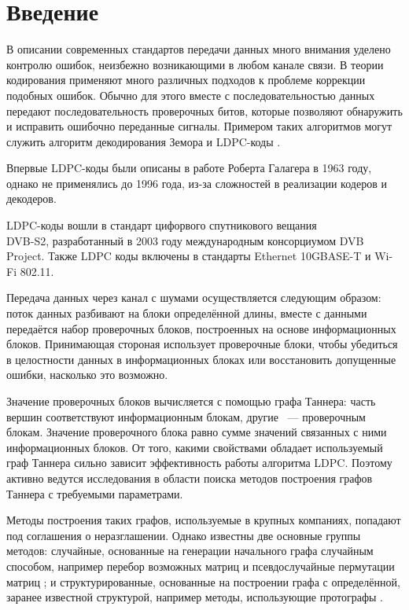 \documentclass[14pt]{mmcs-article}
\begin{document}


\renewcommand{\contentsname}{Оглавление}

\tableofcontents

\newpage
{}
\section*{Введение}

В описании современных стандартов передачи данных много внимания уделено контролю ошибок, неизбежно возникающими в любом канале связи. В теории кодирования применяют много различных подходов к проблеме коррекции подобных ошибок. Обычно для этого вместе с последовательностью данных передают последовательность проверочных битов, которые позволяют обнаружить и исправить ошибочно переданные сигналы. Примером таких алгоритмов могут служить алгоритм декодирования Земора \cite{zemor} и LDPC-коды \cite{johnson}.

Впервые LDPC-коды были описаны в работе Роберта Галагера \cite{gallager} в 1963 году, однако не применялись до 1996 года, из-за сложностей в реализации кодеров и декодеров.

LDPC-коды вошли в стандарт цифорвого спутникового вещания\\ DVB-S2, разработанный в 2003 году международным консорциумом DVB Project. Также LDPC коды включены в стандарты Ethernet 10GBASE-T и Wi-Fi 802.11.

Передача данных через канал с шумами осуществляется следующим образом: поток данных разбивают на блоки определённой длины, вместе с данными передаётся набор проверочных блоков, построенных на основе информационных блоков. Принимающая стороная использует проверочные блоки, чтобы убедиться в целостности данных в информационных блоках или  восстановить допущенные ошибки, насколько это возможно.

Значение проверочных блоков вычисляется с помощью графа Таннера: часть вершин соответствуют информационным блокам, другие ~--- проверочным блокам. Значение проверочного блока равно сумме значений связанных с ними информационных блоков. От того, какими свойствами обладает используемый граф Таннера сильно зависит эффективность работы алгоритма LDPC. Поэтому активно ведутся исследования в области поиска методов построения графов Таннера с требуемыми параметрами.

Методы построения таких графов, используемые в крупных компаниях, попадают под соглашения о неразглашении. Однако известны две основные группы методов: случайные, основанные на генерации начального графа случайным способом, например перебор возможных матриц \cite{bruteforce} и псевдослучайные пермутации матриц \cite{gallager}; и структурированные, основанные на построении графа с определённой, заранее известной структурой, например методы, использующие протографы \cite{protographs}.
\end{document}
